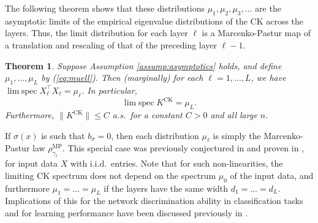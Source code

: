 \documentclass{article}
\newtheorem{theorem}{Theorem}[section]
\theoremstyle{definition}
\newcommand{\CK}{\text{CK}}
\newcommand{\MP}{\text{MP}}
\newcommand{\1}{\mathbf{1}}
\newcommand{\limspec}{\operatorname{lim\;spec}}
\begin{document}
The following theorem shows that these distributions $\mu_1,\mu_2,\mu_3,\ldots$
are the asymptotic limits of the empirical eigenvalue distributions of the CK
across the layers. Thus, the limit distribution for each layer $\ell$
is a Marcenko-Pastur map of a translation and rescaling of that of the preceding
layer $\ell-1$.

\begin{theorem}\label{thm:CK}
Suppose Assumption \ref{assump:asymptotics} holds, and
define $\mu_1,\ldots,\mu_L$ by (\ref{eq:muell}). Then (marginally) for each
$\ell=1,\ldots,L$, we have $\limspec X_\ell^\top X_\ell=\mu_\ell$. In
particular,
\[\limspec K^\CK=\mu_L.\]
Furthermore, $\|K^\CK\| \leq C$ a.s.\ for a constant $C>0$ and all large $n$.
\end{theorem}

If $\sigma(x)$ is such that $b_\sigma=0$, then each distribution
$\mu_\ell$ is simply the Marcenko-Pastur law $\rho_{\gamma_\ell}^\MP$. This
special case was previously conjectured in \cite{pennington2017nonlinear}
and proven in \cite{benigni2019eigenvalue}, for input data $X$ with
i.i.d.\ entries. Note that for such non-linearities, the limiting CK spectrum
does not depend on the spectrum $\mu_0$ of the input data, and furthermore
$\mu_1=\ldots=\mu_L$ if the layers have the same width $d_1=\ldots=d_L$.
Implications of this for the network discrimination ability in classification
tasks and for learning performance have been discussed previously in \cite{couillet2016kernel,pennington2017nonlinear,louart2018random,liao2019inner,adlam2019random}.
\end{document}
